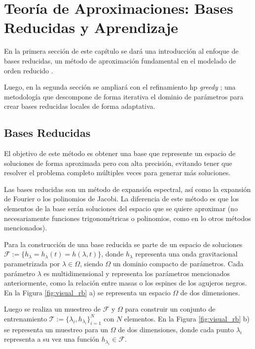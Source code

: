 \chapter{Teoría de Aproximaciones: Bases Reducidas y Aprendizaje}


En la primera sección de este capítulo se dará una introducción al enfoque de bases reducidas, un método de aproximación fundamental en el modelado de orden reducido \cite{Tiglio:2021ysj}. 

Luego, en la segunda sección se ampliará con el refinamiento hp \textit{greedy} \cite{Cerino:2022dhr}; una metodología que descompone de forma iterativa el dominio de parámetros para crear bases reducidas locales de forma adaptativa.


\section{Bases Reducidas}

El objetivo de este método es obtener una base que represente un espacio de soluciones de forma aproximada pero con alta precisión, evitando tener que resolver el problema completo múltiples veces para generar más soluciones. 


Las bases reducidas son un método de expansión espectral, así como la expansión de Fourier o los polinomios de Jacobi. La diferencia de este método es que los elementos de la base serán soluciones del espacio que se quiere aproximar (no necesariamente funciones trigonométricas o polinomios, como en lo otros métodos mencionados).

Para la construcción de una base reducida se parte de un espacio de soluciones \mbox{$\mathcal{F}:= \{ h_{\lambda} = h_{\lambda}(t) = h(\lambda, t)\}$}, donde $h_{\lambda}$ representa una onda gravitacional parametrizada por $\lambda \in \Omega$, siendo $\Omega$ un dominio compacto de parámetros. Cada parámetro $\lambda$ es multidimensional y representa los parámetros mencionados anteriormente, como la relación entre masas o los espines de los agujeros negros. En la Figura \ref{fig:visual_rb} a) se representa un espacio $\Omega$ de dos dimensiones.

Luego se realiza un muestreo de $\mathcal{F}$ y $\Omega$ para construir un conjunto de entrenamiento $\mathcal{T} := \{\lambda_i, h_{\lambda_i}\}_{i=1}^N$ con $N$ elementos. En la Figura \ref{fig:visual_rb} b) se representa un muestreo para un $\Omega$ de dos dimensiones, donde cada punto $\lambda_i$ representa a su vez una función $h_{\lambda_i} \in \mathcal{F}$.

